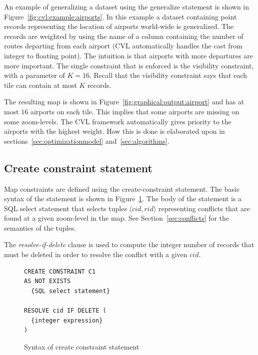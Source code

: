 An example of generalizing a dataset using the generalize statement is shown in Figure~\ref{fig:cvl:example:airports}. In this example a dataset containing point records representing the location of airports world-wide is generalized. The records are weighted by using the name of a column containing the number of routes departing from each airport (CVL automatically handles the cast from integer to floating point). The intuition is that airports with more departures are more important. The single constraint that is enforced is the visibility constraint, with a parameter of $K=16$. Recall that the visibility constraint says that each tile can contain at most $K$ records.


The resulting map is shown in Figure~\ref{fig:graphical:output:airport} and has at most $16$ airports on each tile. This implies that some airports are missing on some zoom-levels. The CVL framework automatically gives priority to the airports with the highest weight. How this is done is elaborated upon in sections~\ref{sec:optimizationmodel} and~\ref{sec:algorithms}.

\subsection{Create constraint statement}
\label{sec:create:constraint:statement}

Map constraints are defined using the create-constraint statement.  The basic syntax of the statement is shown in Figure~\ref{fig:create:constraint:syntax}. The body of the statement is a SQL select statement that selects tuples $\langle cid, rid\rangle$ representing conflicts that are found at a given zoom-level in the map. See Section~\ref{sec:conflicts} for the semantics of the tuples.

The \emph{resolve-if-delete} clause is used to compute the integer number of records that must be deleted in order to resolve the conflict with a given $cid$. 

\begin{figure}[htbp]
\begin{center}
\begin{lstlisting}
CREATE CONSTRAINT C1
AS NOT EXISTS
  {SQL select statement}
  
RESOLVE cid IF DELETE (
  {integer expression}
)
\end{lstlisting}
\caption{Syntax of create constraint statement}
\label{fig:create:constraint:syntax}
\end{center}
\end{figure}

